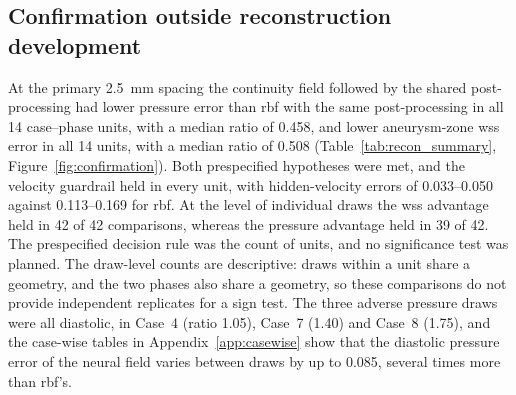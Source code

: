 \documentclass[12pt,a4paper]{article}
\newcommand{\WSS}{\ac{wss}\xspace}
\newcommand{\RBF}{\ac{rbf}\xspace}
\theoremstyle{definition}
\numberwithin{equation}{section}
\providecommand{\DIFaddtex}[1]{{\protect\color{blue} \sf #1}} %
\providecommand{\DIFdeltex}[1]{{\protect\color{red} \scriptsize #1}} %
\providecommand{\DIFaddbegin}{} %
\providecommand{\DIFaddend}{} %
\providecommand{\DIFdelbegin}{} %
\providecommand{\DIFdelend}{} %
\providecommand{\DIFadd}[1]{\texorpdfstring{\DIFaddtex{#1}}{#1}} %
\providecommand{\DIFdel}[1]{\texorpdfstring{\DIFdeltex{#1}}{}} %
\newcommand{\DIFscaledelfig}{0.5}
\newlength{\DIFdelgraphicswidth} %
\newlength{\DIFdelgraphicsheight} %
\newcommand{\DIFaddincludegraphics}[2][]{{\color{blue}\fbox{\DIFOincludegraphics[#1]{#2}}}} %
\newcommand{\DIFdelincludegraphics}[2][]{%
\sbox{\DIFdelgraphicsbox}{\DIFOincludegraphics[#1]{#2}}%
\settoboxwidth{\DIFdelgraphicswidth}{\DIFdelgraphicsbox} %
\settoboxtotalheight{\DIFdelgraphicsheight}{\DIFdelgraphicsbox} %
\scalebox{\DIFscaledelfig}{%
\parbox[b]{\DIFdelgraphicswidth}{\usebox{\DIFdelgraphicsbox}\\[-\baselineskip] \rule{\DIFdelgraphicswidth}{0em}}\llap{\resizebox{\DIFdelgraphicswidth}{\DIFdelgraphicsheight}{%
\setlength{\unitlength}{\DIFdelgraphicswidth}%
\begin{picture}(1,1)%
\thicklines\linethickness{2pt} %
{\color[rgb]{1,0,0}\put(0,0){\framebox(1,1){}}}%
{\color[rgb]{1,0,0}\put(0,0){\line( 1,1){1}}}%
{\color[rgb]{1,0,0}\put(0,1){\line(1,-1){1}}}%
\end{picture}%
}\hspace*{3pt}}} %
} %
\DeclareRobustCommand{\DIFaddbegin}{\DIFOaddbegin \let\includegraphics\DIFaddincludegraphics} %
\DeclareRobustCommand{\DIFaddend}{\DIFOaddend \let\includegraphics\DIFOincludegraphics} %
\DeclareRobustCommand{\DIFdelbegin}{\DIFOdelbegin \let\includegraphics\DIFdelincludegraphics} %
\DeclareRobustCommand{\DIFdelend}{\DIFOaddend \let\includegraphics\DIFOincludegraphics} %
\renewcommand{\DIFaddtex}[1]{{\protect\color{red}#1}}
\renewcommand{\DIFdeltex}[1]{}
\renewcommand{\DIFdel}[1]{}
\renewcommand{\DIFaddincludegraphics}[2][]{\DIFOincludegraphics[#1]{#2}}
\renewcommand{\DIFdelincludegraphics}[2][]{}
\def\DIFaddbegin{}\def\DIFaddend{}%
\def\DIFdelbegin{}\def\DIFdelend{}%
\begin{document}



\subsection{Confirmation \DIFdelbegin \DIFdel{on seven held-out geometries}\DIFdelend \DIFaddbegin \DIFadd{outside reconstruction development}\DIFaddend }
\label{sec:confirmation}
At the primary 2.5~mm spacing the continuity field followed by the shared post-processing had lower pressure error than \RBF with the same post-processing in all 14 case--phase units, with a median ratio of 0.458, and lower aneurysm-zone \WSS error in all 14 units, with a median ratio of 0.508 (Table~\ref{tab:recon_summary}, Figure~\ref{fig:confirmation}). Both prespecified hypotheses were met, and the velocity guardrail held in every unit, with hidden-velocity errors of 0.033--0.050 against 0.113--0.169 for \RBF. At the level of individual draws the \WSS advantage held in 42 of 42 comparisons, whereas the pressure advantage held in 39 of 42. The prespecified decision rule was the count of units, and no significance test was planned. \DIFdelbegin \DIFdel{For reference, a two-sided sign test on the }\DIFdelend \DIFaddbegin \DIFadd{The }\DIFaddend draw-level \DIFdelbegin \DIFdel{comparisons gives $p<10^{-8}$ for both quantities, although }\DIFdelend \DIFaddbegin \DIFadd{counts are descriptive: }\DIFaddend draws within a unit share a geometry\DIFdelbegin \DIFdel{and are not independent}\DIFdelend \DIFaddbegin \DIFadd{, and the two phases also share a geometry, so these comparisons do not provide independent replicates for a sign test}\DIFaddend . The three adverse pressure draws were all diastolic, in Case~4 (ratio 1.05), Case~7 (1.40) and Case~8 (1.75), and the case-wise tables in Appendix~\ref{app:casewise} show that the diastolic pressure error of the neural field varies between draws by up to 0.085, several times more than \RBF's.


\end{document}

